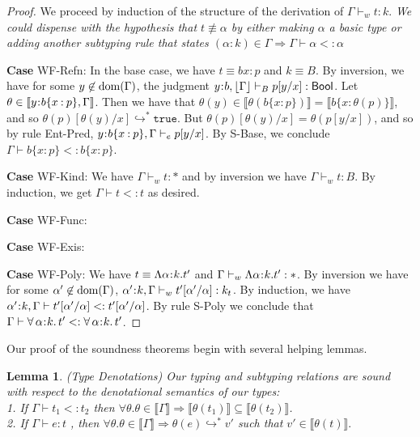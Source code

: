 \documentclass[11pt]{article}
\newtheorem{lemma}[theorem]{Lemma}
\newcommand{\al}{\alpha}
\newcommand{\bind}{\hspace{0.05em}{:}\hspace{0.05em}} %
\newcommand{\col}{\mathbin{:}}       %
\newcommand{\lb}{\llbracket}         %
\newcommand{\rb}{\rrbracket}         %
\newcommand{\many}{\hookrightarrow^*}
\newcommand{\true}{\mathtt{true}}
\newcommand{\Bool}{{\sf Bool}}
\newcommand{\polytype}[3]{\forall\, #1\bind #2.\, #3}
\newcommand{\dom}[1]{{\rm dom}(#1)}
\begin{document}
\begin{proof} We proceed by induction of the structure of the derivation of $\Gamma \vdash_w t : k$. {\em We could dispense with the hypothesis that $t \not\equiv \al$ by either making $\al$ a basic type or adding another subtyping rule that states $(\al\col k)\in\Gamma \Rightarrow \Gamma \vdash \al <: \al$}

{\bf Case} {\sc WF-Refn}: In the base case, we have $t \equiv b{x\col p}$ and $k \equiv B$. By inversion, we have for some $y \not\in \dom{\Gamma}$, the judgment $y\bind b, \lfloor \Gamma \rfloor \vdash_B p[y/x] : \Bool$. Let $\theta \in \lb y\bind b\{x\col p\}, \Gamma\rb$. Then we have that $\theta(y) \in \lb\theta(b\{x\col p\})\rb = \lb b\{x\col \theta(p)\}\rb$, and so $\theta(p)[\theta(y)/x] \many \true$. But $\theta(p)[\theta(y)/x] = \theta(p[y/x])$, and so by rule {\sc Ent-Pred}, $y\bind b\{x\col p\}, \Gamma \vdash_e p[y/x]$. By {\sc S-Base}, we conclude $\Gamma \vdash b\{x\col p\} <: b\{x \col p\}$.
	
{\bf Case} {\sc WF-Kind}:  We have $\Gamma \vdash_w t : *$ and by inversion we have $\Gamma \vdash_w t : B$. By induction, we get $\Gamma \vdash t <: t$ as desired.

{\bf Case} {\sc WF-Func}: 

{\bf Case} {\sc WF-Exis}:

{\bf Case} {\sc WF-Poly}: We have $t \equiv \Lambda\al\bind k.t'$ and $\Gamma \vdash_w\Lambda\al\bind k.t' : *$. By inversion we have for some $\al' \not \in {\rm dom}(\Gamma)$, 
$\al'\bind k, \Gamma\vdash_w t'[\al'/\al]: k_t$. By induction, we have
$\al'\bind k, \Gamma\vdash t'[\al'/\al] <: t'[\al'/\al]$. By rule {\sc S-Poly} we conclude that $\Gamma \vdash \polytype{\al}{k}{t'} <: \polytype{\al}{k}{t'}$.
\end{proof}

Our proof of the soundness theorems begin with several helping lemmas.

\begin{lemma}{(Type Denotations) Our typing and subtyping relations are sound with respect to the denotational semantics of our types:\\
1. If $\Gamma \vdash t_1 <: t_2$ then $\forall \theta. \theta \in \lb \Gamma \rb \Rightarrow \lb\theta(t_1)\rb \subseteq \lb\theta(t_2)\rb$.\\
2. If $\Gamma \vdash e : t$ %
, then $\forall \theta. \theta \in \lb \Gamma \rb \Rightarrow \theta(e) \many v'$ such that $v' \in \lb\theta(t)\rb.$
}\label{type-denote}
\end{lemma}
\end{document}
